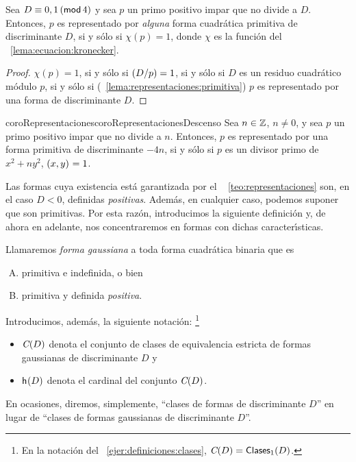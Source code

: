\begin{teoRepresentaciones}\label{teo:representaciones}
	Sea $D\equiv 0,1\tmodulo[4]$ y sea $p$ un primo positivo impar
	que no divide a $D$. Entonces, $p$ es representado
	por \emph{alguna} forma cuadr\'atica primitiva de discriminante
	$D$, si y s\'olo si $\chi(p)=1$, donde $\chi$ es la funci\'on del
	\lemaname~\ref{lema:ecuacion:kronecker}.
\end{teoRepresentaciones}

\begin{proof}
	$\chi(p)=1$, si y s\'olo si $\tlegendre D p=1$, si y s\'olo si
	$D$ es un residuo cuadr\'atico m\'odulo $p$, si y s\'olo si
	(\lemaname~\ref{lema:representaciones:primitiva}) $p$ es
	representado por una forma de discriminante $D$.
\end{proof}

\begin{restatable}{coroRepresentaciones}{coroRepresentacionesDescenso}
	\label{coro:representaciones}
	Sea $n\in\Enteros$, $n\neq 0$, y sea $p$ un primo positivo
	impar que no divide a $n$. Entonces, $p$ es representado
	por una forma primitiva de discriminante $-4n$,
	si y s\'olo si $p$ es un divisor primo de $x^2+ny^2$,
	$\mcd{x,y}=1$.
\end{restatable}

Las formas cuya existencia est\'a garantizada por el \teoname~%
\ref{teo:representaciones} son, en el caso $D<0$, definidas
\emph{positivas}. Adem\'as, en cualquier caso, podemos suponer
que son primitivas. Por esta raz\'on,
introducimos la siguiente definici\'on y,
de ahora en adelante,
nos concentraremos en formas con dichas caracter\'{\i}sticas.

\begin{defRepresentaciones}\label{def:representaciones:gaussianas}
	Llamaremos \emph{forma gaussiana} a toda forma cuadr\'atica
	binaria que es
	\begin{enumerate}[(A)]
		\item primitiva e indefinida, o bien
		\item primitiva y definida \emph{positiva}.
	\end{enumerate}
\end{defRepresentaciones}

Introducimos, adem\'as, la siguiente notaci\'on:%
\footnote{
	En la notaci\'on del \ejername~\ref{ejer:definiciones:clases},
	$\Clases(D)=\varClases[1](D)$.
}
\begin{itemize}
	\item $\Clases(D)$ denota el conjunto de clases de
		equivalencia estricta de formas gaussianas de
		discriminante $D$ y
	\item $\nClases(D)$ denota el cardinal del conjunto
		$\Clases(D)$.
\end{itemize}
%
En ocasiones, diremos, simplemente,
``clases de formas de discriminante $D$'' en lugar de
``clases de formas gaussianas de discriminante $D$''.

